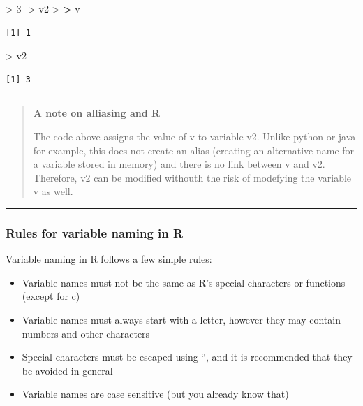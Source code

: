 \documentclass[
]{book}
\newenvironment{Shaded}{\begin{snugshade}}{\end{snugshade}}
\newcommand{\DecValTok}[1]{\textcolor[rgb]{0.00,0.00,0.81}{#1}}
\newcommand{\ErrorTok}[1]{\textcolor[rgb]{0.64,0.00,0.00}{\textbf{#1}}}
\newcommand{\NormalTok}[1]{#1}
\newcommand{\OtherTok}[1]{\textcolor[rgb]{0.56,0.35,0.01}{#1}}
\newcommand{\SpecialCharTok}[1]{\textcolor[rgb]{0.00,0.00,0.00}{#1}}
\theoremstyle{definition}
\theoremstyle{definition}
\theoremstyle{definition}
\theoremstyle{definition}
\theoremstyle{remark}
\begin{document}
\begin{Shaded}
\begin{Highlighting}[]
\SpecialCharTok{\textgreater{}} \DecValTok{3} \OtherTok{{-}\textgreater{}}\NormalTok{ v2}
\SpecialCharTok{\textgreater{}} 
\ErrorTok{\textgreater{}}\NormalTok{ v}
\end{Highlighting}
\end{Shaded}

\begin{verbatim}
[1] 1
\end{verbatim}

\begin{Shaded}
\begin{Highlighting}[]
\SpecialCharTok{\textgreater{}}\NormalTok{ v2}
\end{Highlighting}
\end{Shaded}

\begin{verbatim}
[1] 3
\end{verbatim}

\begin{center}\rule{0.5\linewidth}{0.5pt}\end{center}

\begin{quote}
\textbf{A note on alliasing and R}

The code above assigns the value of v to variable v2. Unlike python or java for example, this does not
create an alias (creating an alternative name for a variable stored in memory) and there is no link between v and
v2. Therefore, v2 can be modified withouth the risk of modefying the variable v as well.
\end{quote}

\begin{center}\rule{0.5\linewidth}{0.5pt}\end{center}

\hypertarget{rules-for-variable-naming-in-r}{%
\subsubsection*{\texorpdfstring{\textbf{Rules for variable naming in R}}{Rules for variable naming in R}}\label{rules-for-variable-naming-in-r}}

Variable naming in R follows a few simple rules:

\begin{itemize}
\item
  Variable names must not be the same as R's special characters or functions (except for c)
\item
  Variable names must always start with a letter, however they may contain numbers and other characters
\item
  Special characters must be escaped using ``, and it is recommended that they be avoided in general
\item
  Variable names are case sensitive (but you already know that)
\end{itemize}
\end{document}
